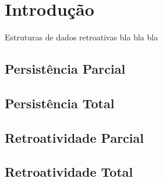 \chapter{Introdução}
\label{cap:introducao}

Estruturas de dados retroativas bla bla bla

\section{Persistência Parcial}
\label{sec:persistencia_parcial}

\section{Persistência Total}
\label{sec:persistencia_total}


\section{Retroatividade Parcial}
\label{sec:retroatividade_parcial}

\section{Retroatividade Total}
\label{sec:retroatividade_total}
